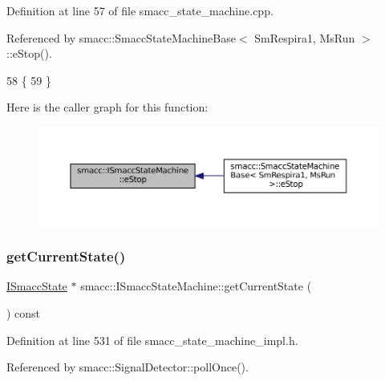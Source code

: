 Definition at line 57 of file smacc\+\_\+state\+\_\+machine.\+cpp.



Referenced by smacc\+::\+Smacc\+State\+Machine\+Base$<$ Sm\+Respira1, Ms\+Run $>$\+::e\+Stop().


\begin{DoxyCode}
58 \{
59 \}
\end{DoxyCode}
Here is the caller graph for this function\+:
\nopagebreak
\begin{figure}[H]
\begin{center}
\leavevmode
\includegraphics[width=350pt]{classsmacc_1_1ISmaccStateMachine_a66a2900be8629748dab7a5c5ab6ae94e_icgraph}
\end{center}
\end{figure}
\mbox{\label{classsmacc_1_1ISmaccStateMachine_a610d09dc5341fb63732be713c21fbe86}} 
\subsubsection{\texorpdfstring{get\+Current\+State()}{getCurrentState()}}
{\footnotesize\ttfamily \hyperlink{classsmacc_1_1ISmaccState}{I\+Smacc\+State} $\ast$ smacc\+::\+I\+Smacc\+State\+Machine\+::get\+Current\+State (\begin{DoxyParamCaption}{ }\end{DoxyParamCaption}) const\hspace{0.3cm}{\ttfamily [inline]}}



Definition at line 531 of file smacc\+\_\+state\+\_\+machine\+\_\+impl.\+h.



Referenced by smacc\+::\+Signal\+Detector\+::poll\+Once().


